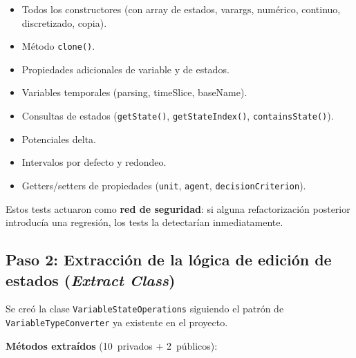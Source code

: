 \documentclass[11pt,a4paper]{article}
\newcommand{\code}[1]{\texttt{#1}}
\begin{document}
\begin{itemize}[nosep]
  \item Todos los constructores (con array de estados, varargs,
        num\'erico, continuo, discretizado, copia).
  \item M\'etodo \code{clone()}.
  \item Propiedades adicionales de variable y de estados.
  \item Variables temporales (parsing, timeSlice, baseName).
  \item Consultas de estados (\code{getState()},
        \code{getStateIndex()}, \code{containsState()}).
  \item Potenciales delta.
  \item Intervalos por defecto y redondeo.
  \item Getters/setters de propiedades (\code{unit}, \code{agent},
        \code{decisionCriterion}).
\end{itemize}

Estos tests actuaron como \textbf{red de seguridad}: si alguna
refactorizaci\'on posterior introduc\'ia una regresi\'on, los tests la
detectar\'ian inmediatamente.

\subsection{Paso 2: Extracci\'on de la l\'ogica de edici\'on de estados
            (\emph{Extract Class})}
\label{sec:extract}

Se cre\'o la clase \code{VariableStateOperations} siguiendo el patr\'on
de \code{VariableTypeConverter} ya existente en el proyecto.

\textbf{M\'etodos extra\'idos} (10~privados + 2~p\'ublicos):
\end{document}
